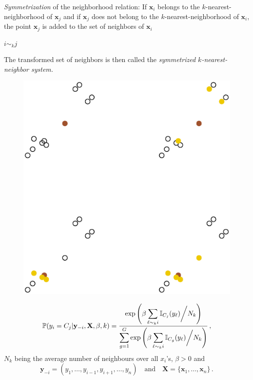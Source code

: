 \begin{slide}
{\em Symmetrization} of the neighborhood relation: If $\mathbf{x}_i$ belongs to the $k$-nearest-neighborhood
of $\mathbf{x}_j$ and if $\mathbf{x}_j$ does not belong to the $k$-nearest-neighborhood of $\mathbf{x}_i$, 
the point $\mathbf{x}_j$ is added to the set of neighbors of $\mathbf{x}_i$

\vs\pause
{} $i\sim_k j$

\vs\pause The transformed set of neighbors is then called the {\em symmetrized
$k$-nearest-neighbor system.} 

\end{slide}\begin{slide}

\begin{figure}
\includegraphics[width=.7\textwidth]{figures/neighbR.eps}
\end{figure}

\end{slide}\begin{slide}

$$
\mathbb{P}(y_i=C_j|\mathbf{y}_{-i},\mathbf{X},\beta,k)=\frac{\displaystyle \exp\left(\beta \sum_{\ell\sim_k i}
\mathbb{I}_{C_j}(y_\ell)\bigg/N_k \right)}
{\displaystyle \sum_{g=1}^G\exp\left(\beta \sum_{{\ell\sim_k i}} \mathbb{I}_{C_g}(y_\ell)\bigg/N_k \right)}\,,
$$
$N_k$ being the average number of neighbours over all $x_i$'s, $\beta>0$ and
$$
\mathbf{y}_{-i}=\left(y_1,\ldots,y_{i-1},y_{i+1},\ldots,y_n\right)\quad \mbox{and}
\quad \mathbf{X}=\{\mathbf{x}_1,\ldots,\mathbf{x}_n\}\,.
$$


\end{slide}
